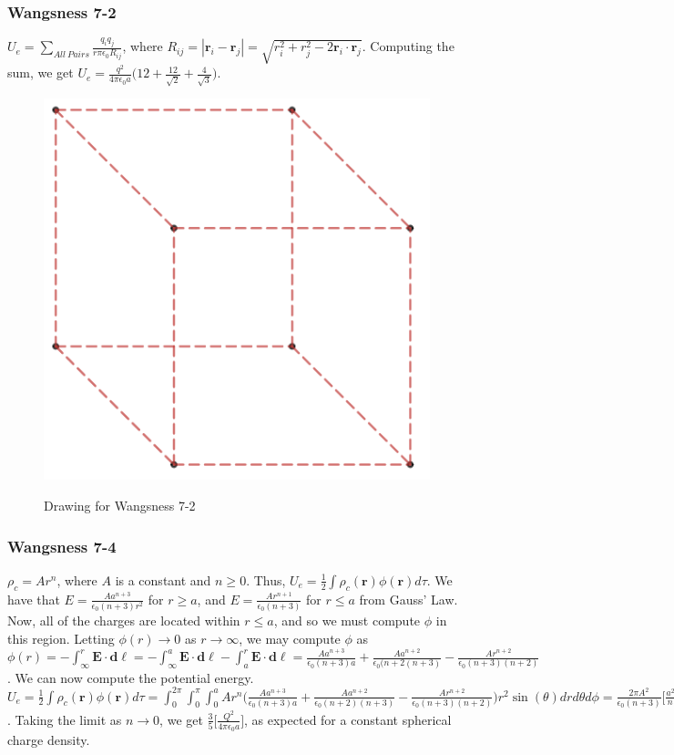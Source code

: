 \documentclass[oneside]{book}
\theoremstyle{mystyle}
\begin{document}
\subsubsection{Wangsness 7-2}
$U_e = \underset{All\ Pairs}\sum\frac{q_i q_j}{r\pi \epsilon_0 R_{ij}}$, where $R_{ij} = |\mathbf{r}_i-\mathbf{r}_j| = \sqrt{r_i^2+r_j^2 -2\mathbf{r}_i\cdot \mathbf{r}_j}$. Computing the sum, we get $U_e = \frac{q^2}{4\pi \epsilon_0 a}\big(12 + \frac{12}{\sqrt{2}}+\frac{4}{\sqrt{3}}\big)$.
\begin{figure}[htbp]
    \centering
    {\includegraphics[scale=0.4]{7-2.png}}
    \caption{Drawing for Wangsness 7-2}
\end{figure}
\subsubsection{Wangsness 7-4}
$\rho_c = Ar^n$, where $A$ is a constant and $n\geq 0$. Thus, $U_e = \frac{1}{2} \int \rho_c(\mathbf{r})\phi(\mathbf{r})d\tau$. We have that $E = \frac{Aa^{n+3}}{\epsilon_0 (n+3)r^2}$ for $r\geq a$, and $E=\frac{Ar^{n+1}}{\epsilon_0(n+3)}$ for $r\leq a$ from Gauss' Law. Now, all of the charges are located within $r\leq a$, and so we must compute $\phi$ in this region. Letting $\phi(r)\rightarrow 0$ as $r\rightarrow \infty$, we may compute $\phi$ as $\phi(r) = -\int_{\infty}^{r}\mathbf{E}\cdot \mathbf{d\ell} = -\int_{\infty}^{a} \mathbf{E}\cdot \mathbf{d\ell} - \int_{a}^{r}\mathbf{E}\cdot \mathbf{d\ell} = \frac{Aa^{n+3}}{\epsilon_0(n+3)a}+\frac{Aa^{n+2}}{\epsilon_0(n+2(n+3)}-\frac{Ar^{n+2}}{\epsilon_0(n+3)(n+2)}$. We can now compute  the potential energy. $U_e =\frac{1}{2}\int \rho_c(\mathbf{r})\phi(\mathbf{r})d\tau = \int_{0}^{2\pi} \int_{0}^{\pi}\int_{0}^{a} A r^n \bigg(\frac{Aa^{n+3}}{\epsilon_0(n+3)a}+\frac{Aa^{n+2}}{\epsilon_0(n+2)(n+3)}-\frac{Ar^{n+2}}{\epsilon_0(n+3)(n+2)}\bigg)r^2 \sin(\theta)dr d\theta d\phi = \frac{2\pi A^2}{\epsilon_0 (n+3)}\bigg[\frac{a^{2n+5}}{n+3}+\frac{a^{2n+5}}{(n+2)(n+3)}-\frac{a^{2n+5}}{(n+2)(2n+5)}\bigg]$. Taking the limit as $n\rightarrow 0$, we get $\frac{3}{5}\bigg[\frac{Q^2}{4\pi \epsilon_0 a}\bigg]$, as expected for a constant spherical charge density.
\end{document}

